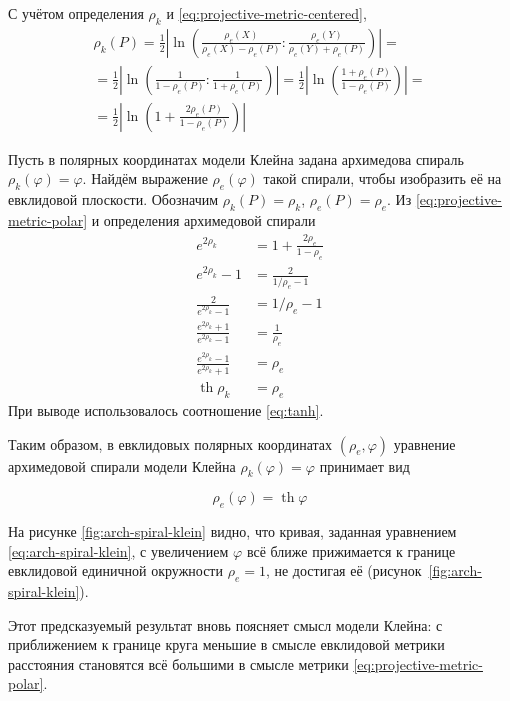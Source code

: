 \documentclass{article}
\numberwithin{equation}{section}
\renewcommand{\phi}{\varphi}
\renewcommand{\th}{\operatorname{th}}
\providecommand{\abs}[1]{\left \lvert{#1}\right \rvert}
\begin{document}


С учётом определения $\rho_k$ и \eqref{eq:projective-metric-centered},
\begin{multline}\label{eq:projective-metric-polar}
  \rho_k(P) =
  \frac{1}{2}\abs{\ln\left(\frac{\rho_e(X)}{\rho_e(X)-\rho_e(P)}:\frac{\rho_e(Y)}{\rho_e(Y)+\rho_e(P)}\right)}  = \\
  =\frac{1}{2}\abs{\ln\left(\frac{1}{1-\rho_e(P)}:\frac{1}{1+\rho_e(P)}\right)} =
  \frac{1}{2}\abs{\ln\left(\frac{1+\rho_e(P)}{1-\rho_e(P)}\right)} =\\
  = \frac{1}{2}\abs{\ln\left(1+\frac{2\rho_e(P)}{1-\rho_e(P)}\right)}
\end{multline}

Пусть в полярных координатах модели Клейна задана архимедова спираль
$\rho_k(\phi) = \phi$. Найдём выражение $\rho_e(\phi)$ такой спирали,
чтобы изобразить её на евклидовой плоскости. Обозначим $\rho_k(P) =
\rho_k$, $\rho_e(P) = \rho_e$. Из \eqref{eq:projective-metric-polar} и
определения архимедовой спирали
\begin{align*}
  e^{2\rho_k} &= 1+\frac{2\rho_e}{1-\rho_e} \\
  e^{2\rho_k}-1 &= \frac{2}{1/\rho_e-1} \\
  \frac{2}{e^{2\rho_k}-1} &=1/\rho_e-1 \\
  \frac{e^{2\rho_k}+1}{e^{2\rho_k}-1} &= \frac{1}{\rho_e} \\
  \frac{e^{2\rho_k}-1}{e^{2\rho_k}+1} &= \rho_e \\
  \th \rho_k &= \rho_e
\end{align*}
При выводе использовалось соотношение \eqref{eq:tanh}.

Таким образом, в евклидовых полярных координатах $(\rho_e, \phi)$
уравнение архимедовой спирали модели Клейна $\rho_k(\phi) = \phi$ принимает вид

\begin{equation}\label{eq:arch-spiral-klein}
  \rho_e(\phi) = \th{\phi}
\end{equation}



На рисунке \ref{fig:arch-spiral-klein} видно, что кривая, заданная
уравнением \eqref{eq:arch-spiral-klein}, с увеличением $\phi$ всё
ближе прижимается к границе евклидовой единичной окружности
$\rho_e=1$, не достигая её (рисунок \ref{fig:arch-spiral-klein}).

Этот предсказуемый результат вновь поясняет смысл модели Клейна: с
приближением к границе круга меньшие в смысле евклидовой метрики
расстояния становятся всё большими в смысле метрики
\eqref{eq:projective-metric-polar}.
\end{document}
